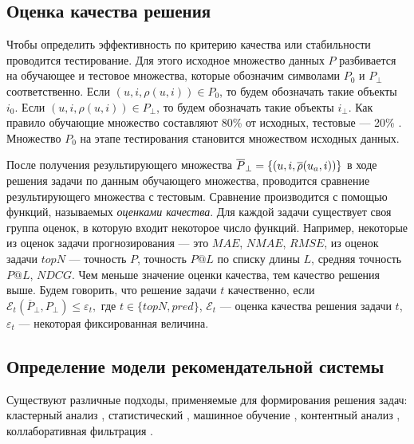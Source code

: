 \subsection{Оценка качества решения}
Чтобы определить эффективность по критерию качества или стабильности
проводится тестирование. Для этого исходное множество данных $P$
разбивается на обучающее и тестовое множества, которые обозначим символами
$P_0$ и $P_{\bot}$ соответственно.
Если $(u, i, \rho(u, i)) \in P_0$, то будем обозначать такие объекты $i_0$.
Если $(u, i, \rho(u, i)) \in P_{\bot}$, то будем обозначать такие объекты $i_{\bot}$.
Как правило обучающие
множество составляют 80\% от исходных, тестовые --- 20\%  \cite{8020-1,
8020-2}. Множество $P_0$ на этапе
тестирования становится множеством исходных данных.

После получения результирующего множества
$\overline{P}_{\bot} = \{(u, i, \overline{\rho}(u_a, i))\}$ в ходе решения задачи
по данным обучающего множества, проводится
сравнение результирующего множества с тестовым.
Сравнение производится
с помощью функций, называемых {\it оценками качества}. Для каждой задачи существует
своя группа оценок, в которую входит некоторое число функций.
Например,
некоторые из оценок задачи прогнозирования  \cite{rs-handbook,rs-eval-shani} --- это $MAE$, $NMAE$, $RMSE$,
из оценок задачи $topN$  \cite{rs-handbook,herloker-eval,eval-precision} ---
точность $P$, точность $P@L$ по списку длины $L$, средняя точность
$P@L$, $NDCG$. Чем меньше значение оценки качества, тем качество решения выше.
Будем говорить, что решение задачи $t$ качественно,
если $\mathcal{E}_{t}(\overline{P}_{\bot}, P_{\bot}) \le \varepsilon_{t},$ где
$t \in \{topN, pred\}$, $\mathcal{E}_{t}$ --- оценка качества
решения задачи $t$, $\varepsilon_{t}$ --- некоторая фиксированная
величина.
\subsection{Определение модели рекомендательной системы}
Существуют различные подходы, применяемые для формирования решения задач:
кластерный анализ  \cite{cluster1,cluster2,cluster3,cluster4,cluster5,cluster6, cluster7, cluster8},
статистический  \cite{stat1, stat2, stat3, stat4, stat5, stat6, stat7, stat8, stat10, stat11, stat12},
машинное обучение  \cite{learning4, learning1, learning2, learning3, learning5, learning6, learning7, learning8, learning9, learning10, learning11, learning12},
контентный анализ  \cite{content8, content1, content3, content4, content6,
content7, content9, content10, content11, content12}, коллаборативная
фильтрация
 \cite{cfrs,
item-based, 2d, empirical-cf, coscial-rec-survey, surveyCf, Marlin04collaborativefiltering}.

